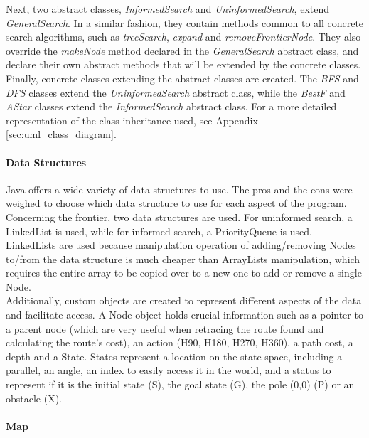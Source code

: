\documentclass[letterpaper,12pt]{article}
\begin{document}
Next, two abstract classes, \textit{InformedSearch} and \textit{UninformedSearch}, extend \textit{GeneralSearch}. In a similar fashion, they contain methods common to all concrete search algorithms, such as \textit{treeSearch}, \textit{expand} and \textit{removeFrontierNode}. They also override the \textit{makeNode} method declared in the \textit{GeneralSearch} abstract class, and declare their own abstract methods that will be extended by the concrete classes.\\

Finally, concrete classes extending the abstract classes are created. The \textit{BFS} and \textit{DFS} classes extend the \textit{UninformedSearch} abstract class, while the \textit{BestF} and \textit{AStar} classes extend the \textit{InformedSearch} abstract class. For a more detailed representation of the class inheritance used, see Appendix \ref{sec:uml_class_diagram}.\\

\paragraph{Data Structures}

Java offers a wide variety of data structures to use. The pros and the cons were weighed to choose which data structure to use for each aspect of the program. Concerning the frontier, two data structures are used. For uninformed search, a LinkedList is used, while for informed search, a PriorityQueue is used. LinkedLists are used because manipulation operation of adding/removing Nodes to/from the data structure is much cheaper than ArrayLists manipulation, which requires the entire array to be copied over to a new one to add or remove a single Node.\\

Additionally, custom objects are created to represent different aspects of the data and facilitate access. A Node object holds crucial information such as a pointer to a parent node (which are very useful when retracing the route found and calculating the route's cost), an action (H90, H180, H270, H360), a path cost, a depth and a State. States represent a location on the state space, including a parallel, an angle, an index to easily access it in the world, and a status to represent if it is the initial state (S), the goal state (G), the pole (0,0) (P) or an obstacle (X).

\paragraph{Map}
\end{document}
